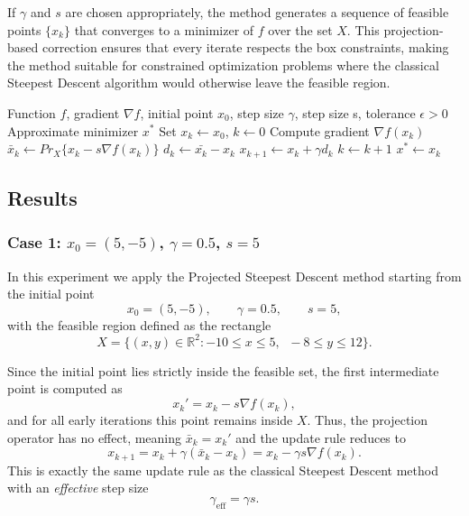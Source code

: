 \documentclass[11pt]{article}
\begin{document}
If $\gamma$ and $s$ are chosen appropriately, the method generates a sequence of feasible points
$\{x_k\}$ that converges to a minimizer of $f$ over the set $X$.  
This projection-based correction ensures that every iterate respects the box constraints, making the method suitable
for constrained optimization problems where the classical Steepest Descent algorithm would otherwise leave the feasible region.


\begin{algorithm}[H]
\caption{Projected Steepest Descent Method}
\begin{algorithmic}[1]
\Require Function $f$, gradient $\nabla f$, initial point $x_0$, step size $\gamma$, step size s, tolerance $\epsilon > 0$
\Ensure Approximate minimizer $x^*$
\State Set $x_k \gets x_0$, $k \gets 0$
    \State Compute gradient $\nabla f(x_k)$
    \State $\bar{x}_k \gets Pr_X\{x_k- s \nabla f(x_k)\}$ 
    \State $d_k \gets \bar{x_k} - x_k$ 
    \State $x_{k+1} \gets x_k + \gamma d_k$
    \State $k \gets k + 1$
\EndWhile
\State \Return $x^* \gets x_k$
\end{algorithmic}
\end{algorithm}

\newpage
\subsection{Results}

\subsubsection{Case 1: $x_0 = (5,-5)$, $\gamma = 0.5$, $s = 5$}

In this experiment we apply the Projected Steepest Descent method starting from the initial point
\[
x_0 = (5,-5), \qquad \gamma = 0.5, \qquad s = 5,
\]
with the feasible region defined as the rectangle
\[
X = \{(x,y)\in\mathbb{R}^2 : -10 \le x \le 5,\;\; -8 \le y \le 12\}.
\]

Since the initial point lies strictly inside the feasible set, the first intermediate point is computed as
\[
x_k' = x_k - s\nabla f(x_k),
\]
and for all early iterations this point remains inside $X$.  
Thus, the projection operator has no effect, meaning $\bar{x}_k = x_k'$ and the update rule reduces to
\[
x_{k+1} = x_k + \gamma(\bar{x}_k - x_k)
        = x_k - \gamma s \nabla f(x_k).
\]
This is exactly the same update rule as the classical Steepest Descent method with an \emph{effective} step size
\[
\gamma_{\text{eff}} = \gamma s.
\]
\end{document}
